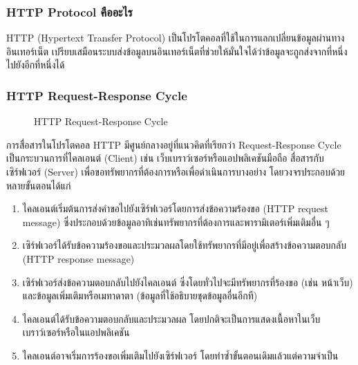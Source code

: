 \documentclass[14pt,oneside,openright,a4paper]{cpe-thai-project}
\begin{document}
  \subsubsection {HTTP Protocol คืออะไร}
    HTTP \cite{HTTPProtocol} (Hypertext Transfer Protocol) เป็นโปรโตคอลที่ใช้ในการแลกเปลี่ยนข้อมูลผ่านทางอินเทอร์เน็ต เปรียบเสมือนระบบส่งข้อมูลบนอินเทอร์เน็ตที่ช่วยให้มั่นใจได้ว่าข้อมูลจะถูกส่งจากที่หนึ่งไปยังอีกที่หนึ่งได้ 
  
\newpage 

    \subsubsection {HTTP Request-Response Cycle}

    \begin{figure}[!h]\centering
      \setlength{\fboxrule}{0.5mm} %
      \setlength{\fboxsep}{0.3cm}
      \caption{HTTP Request-Response Cycle \cite{HTTPCycle}}\label{fig:http}
    \end{figure}


การสื่อสารในโปรโตคอล HTTP มีศูนย์กลางอยู่ที่แนวคิดที่เรียกว่า Request-Response Cycle เป็นกระบวนการที่ไคลเอนต์ (Client) เช่น เว็บเบราว์เซอร์หรือแอปพลิเคชันมือถือ สื่อสารกับเซิร์ฟเวอร์ (Server) เพื่อขอทรัพยากรที่ต้องการหรือเพื่อดำเนินการบางอย่าง โดยวงจรประกอบด้วยหลายขั้นตอนได้แก่ \\
    \begin{enumerate}
      \item ไคลเอนต์เริ่มต้นการส่งคำขอไปยังเซิร์ฟเวอร์โดยการส่งข้อความร้องขอ (HTTP request message) ซึ่งประกอบด้วยข้อมูลอาทิเช่นทรัพยากรที่ต้องการและพารามิเตอร์เพิ่มเติมอื่น ๆ
      \item เซิร์ฟเวอร์ได้รับข้อความร้องขอและประมวลผลโดยใช้ทรัพยากรที่มีอยู่เพื่อสร้างข้อความตอบกลับ (HTTP response message)
      \item เซิร์ฟเวอร์ส่งข้อความตอบกลับไปยังไคลเอนต์ ซึ่งโดยทั่วไปจะมีทรัพยากรที่ร้องขอ (เช่น หน้าเว็บ) และข้อมูลเพิ่มเติมหรือเมทาดาตา (ข้อมูลที่ใช้อธิบายชุดข้อมูลอื่นอีกที)
      \item ไคลเอนต์ได้รับข้อความตอบกลับและประมวลผล โดยปกติจะเป็นการแสดงเนื้อหาในเว็บเบราว์เซอร์หรือในแอปพลิเคชัน
      \item ไคลเอนต์อาจเริ่มการร้องขอเพิ่มเติมไปยังเซิร์ฟเวอร์ โดยทำซ้ำขั้นตอนเดิมแล้วแต่ความจำเป็น
    \end{enumerate}
\end{document}
